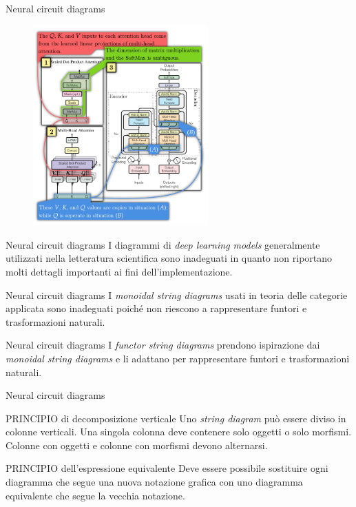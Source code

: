 \documentclass{beamer}
\begin{document}
\begin{frame}{Neural circuit diagrams}
    \begin{figure}
        \begin{center}
            \includegraphics[width=0.6\textwidth,angle=90]{figures/transformer_original.png}
            \caption*{}
        \end{center}
    \end{figure}
\end{frame}

\begin{frame}{Neural circuit diagrams}
    I diagrammi di \textit{deep learning models} generalmente utilizzati nella letteratura scientifica sono inadeguati in quanto non riportano molti dettagli importanti ai fini dell'implementazione.
\end{frame}

\begin{frame}{Neural circuit diagrams}
    I \textit{monoidal string diagrams} usati in teoria delle categorie applicata sono inadeguati poiché non riescono a rappresentare funtori e trasformazioni naturali.
\end{frame}

\begin{frame}{Neural circuit diagrams}
    I \textit{functor string diagrams} prendono ispirazione dai \textit{monoidal string diagrams} e li adattano per rappresentare funtori e trasformazioni naturali.
\end{frame}

\begin{frame}{Neural circuit diagrams}
    \begin{block}{PRINCIPIO di decomposizione verticale}
        Uno \textit{string diagram} può essere diviso in colonne verticali. Una singola colonna deve contenere solo oggetti o solo morfismi. Colonne con oggetti e colonne con morfismi devono alternarsi.
      \end{block}
      
      \begin{block}{PRINCIPIO dell'espressione equivalente}
        Deve essere possibile sostituire ogni diagramma che segue una nuova notazione grafica con uno diagramma equivalente che segue la vecchia notazione.
      \end{block}
\end{frame}
\end{document}
